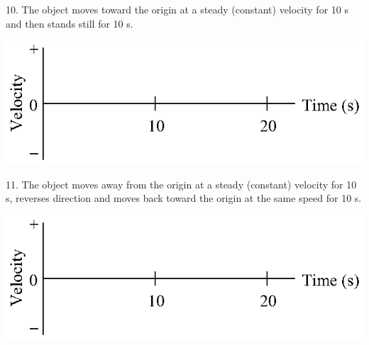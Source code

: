 10. The object moves toward the origin at a steady (constant) velocity for 10
s and then stands still for 10 s.

\vspace{0.3cm}
{\par\centering \includegraphics{velocity/velocity_fig16.eps} \par}
\vspace{0.3cm}

11. The object moves away from the origin at a steady (constant) velocity for
10 s, reverses direction and moves back toward the origin at the same speed
for 10 s.

\vspace{0.3cm}
{\par\centering \includegraphics{velocity/velocity_fig16.eps} \par}
\vspace{0.3cm}

